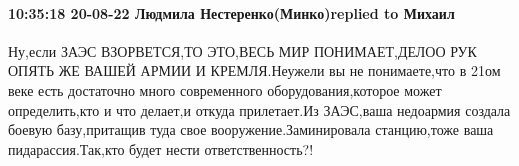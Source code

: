  
 
 
 
 

\paragraph{10:35:18 20-08-22 Людмила Нестеренко(Минко)replied to Михаил}

Ну,если ЗАЭС ВЗОРВЕТСЯ,ТО ЭТО,ВЕСЬ МИР ПОНИМАЕТ,ДЕЛОО РУК ОПЯТЬ ЖЕ ВАШЕЙ АРМИИ
И КРЕМЛЯ.Неужели вы не понимаете,что в 21ом веке есть достаточно много
современного оборудования,которое может определить,кто и что делает,и откуда
прилетает.Из ЗАЭС,ваша недоармия создала боевую базу,притащив туда свое
вооружение.Заминировала станцию,тоже ваша пидарассия.Так,кто будет нести
ответственность?!
